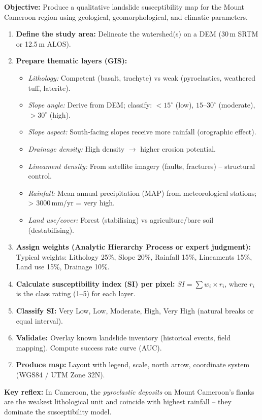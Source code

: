 \documentclass[11pt]{article}
\begin{document}
\begin{methode}
\textbf{Objective:} Produce a qualitative landslide susceptibility map for the Mount Cameroon region using geological, geomorphological, and climatic parameters.
\begin{enumerate}
\item \textbf{Define the study area:} Delineate the watershed(s) on a DEM (30\,m SRTM or 12.5\,m ALOS).
\item \textbf{Prepare thematic layers (GIS):}
\begin{itemize}
\item \textit{Lithology:} Competent (basalt, trachyte) vs weak (pyroclastics, weathered tuff, laterite).
\item \textit{Slope angle:} Derive from DEM; classify: $<15^\circ$ (low), $15–30^\circ$ (moderate), $>30^\circ$ (high).
\item \textit{Slope aspect:} South‑facing slopes receive more rainfall (orographic effect).
\item \textit{Drainage density:} High density $\rightarrow$ higher erosion potential.
\item \textit{Lineament density:} From satellite imagery (faults, fractures) – structural control.
\item \textit{Rainfall:} Mean annual precipitation (MAP) from meteorological stations; > 3000\,mm/yr = very high.
\item \textit{Land use/cover:} Forest (stabilising) vs agriculture/bare soil (destabilising).
\end{itemize}
\item \textbf{Assign weights (Analytic Hierarchy Process or expert judgment):} Typical weights: Lithology 25\%, Slope 20\%, Rainfall 15\%, Lineaments 15\%, Land use 15\%, Drainage 10\%.
\item \textbf{Calculate susceptibility index (SI) per pixel:} $SI = \sum w_i \times r_i$, where $r_i$ is the class rating (1–5) for each layer.
\item \textbf{Classify SI:} Very Low, Low, Moderate, High, Very High (natural breaks or equal interval).
\item \textbf{Validate:} Overlay known landslide inventory (historical events, field mapping). Compute success rate curve (AUC).
\item \textbf{Produce map:} Layout with legend, scale, north arrow, coordinate system (WGS84 / UTM Zone 32N).
\end{enumerate}
\textbf{Key reflex:} In Cameroon, the \emph{pyroclastic deposits} on Mount Cameroon's flanks are the weakest lithological unit and coincide with highest rainfall – they dominate the susceptibility model.
\end{methode}
\end{document}

